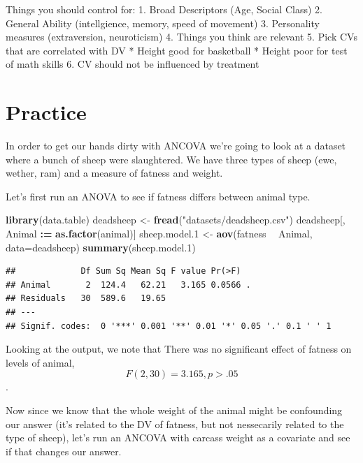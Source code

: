 \documentclass[]{book}
\newenvironment{Shaded}{\begin{snugshade}}{\end{snugshade}}
\newcommand{\KeywordTok}[1]{\textcolor[rgb]{0.13,0.29,0.53}{\textbf{#1}}}
\newcommand{\DataTypeTok}[1]{\textcolor[rgb]{0.13,0.29,0.53}{#1}}
\newcommand{\DecValTok}[1]{\textcolor[rgb]{0.00,0.00,0.81}{#1}}
\newcommand{\StringTok}[1]{\textcolor[rgb]{0.31,0.60,0.02}{#1}}
\newcommand{\OperatorTok}[1]{\textcolor[rgb]{0.81,0.36,0.00}{\textbf{#1}}}
\newcommand{\ErrorTok}[1]{\textcolor[rgb]{0.64,0.00,0.00}{\textbf{#1}}}
\newcommand{\NormalTok}[1]{#1}
\theoremstyle{definition}
\theoremstyle{definition}
\theoremstyle{definition}
\theoremstyle{remark}
\begin{document}
Things you should control for: 1. Broad Descriptors (Age, Social Class)
2. General Ability (intellgience, memory, speed of movement) 3.
Personality measures (extraversion, neuroticism) 4. Things you think are
relevant 5. Pick CVs that are correlated with DV * Height good for
basketball * Height poor for test of math skills 6. CV should not be
influenced by treatment

\section{Practice}\label{practice-2}

In order to get our hands dirty with ANCOVA we're going to look at a
dataset where a bunch of sheep were slaughtered. We have three types of
sheep (ewe, wether, ram) and a measure of fatness and weight.

Let's first run an ANOVA to see if fatness differs between animal type.

\begin{Shaded}
\begin{Highlighting}[]
\KeywordTok{library}\NormalTok{(data.table)}
\NormalTok{deadsheep <-}\StringTok{ }\KeywordTok{fread}\NormalTok{(}\StringTok{"datasets/deadsheep.csv"}\NormalTok{)}
\NormalTok{deadsheep[, Animal }\OperatorTok{:}\ErrorTok{=}\StringTok{ }\KeywordTok{as.factor}\NormalTok{(animal)]}
\NormalTok{sheep.model.}\DecValTok{1}\NormalTok{ <-}\StringTok{ }\KeywordTok{aov}\NormalTok{(fatness }\OperatorTok{~}\StringTok{ }\NormalTok{Animal, }\DataTypeTok{data=}\NormalTok{deadsheep)}
\KeywordTok{summary}\NormalTok{(sheep.model.}\DecValTok{1}\NormalTok{)}
\end{Highlighting}
\end{Shaded}

\begin{verbatim}
##             Df Sum Sq Mean Sq F value Pr(>F)  
## Animal       2  124.4   62.21   3.165 0.0566 .
## Residuals   30  589.6   19.65                 
## ---
## Signif. codes:  0 '***' 0.001 '**' 0.01 '*' 0.05 '.' 0.1 ' ' 1
\end{verbatim}

Looking at the output, we note that There was no significant effect of
fatness on levels of animal, \[F(2,30)=3.165, p > .05\].

Now since we know that the whole weight of the animal might be
confounding our answer (it's related to the DV of fatness, but not
nessecarily related to the type of sheep), let's run an ANCOVA with
carcass weight as a covariate and see if that changes our answer.
\end{document}
